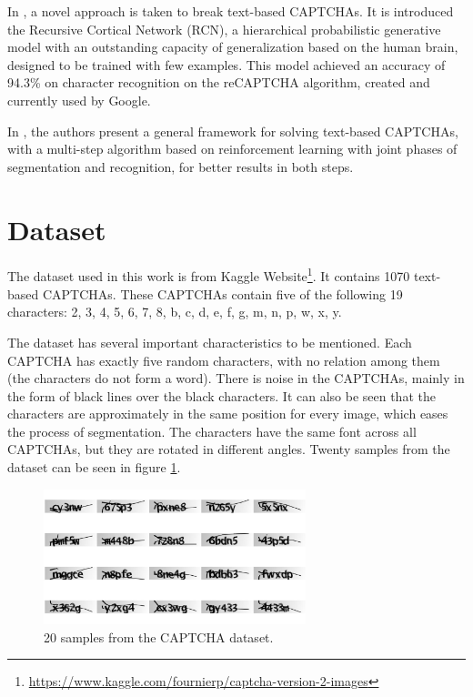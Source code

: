 \documentclass[journal]{IEEEtran}
\begin{document}
In \cite{George2017}, a novel approach is taken to break text-based CAPTCHAs. It is introduced the Recursive Cortical Network (RCN), a hierarchical probabilistic generative model with an outstanding capacity of generalization based on the human brain, designed to be trained with few examples. This model achieved an accuracy of 94.3\% on character recognition on the reCAPTCHA algorithm, created and currently used by Google.

In \cite{185128}, the authors present a general framework for solving text-based CAPTCHAs, with a multi-step algorithm based on reinforcement learning with joint phases of segmentation and recognition, for better results in both steps.


\section{Dataset}

The dataset used in this work is from Kaggle Website\footnote{\url{https://www.kaggle.com/fournierp/captcha-version-2-images}}. It contains 1070 text-based CAPTCHAs. These CAPTCHAs contain five of the following 19 characters: 2, 3, 4, 5, 6, 7, 8, b, c, d, e, f, g, m, n, p, w, x, y.

The dataset has several important characteristics to be mentioned. Each CAPTCHA has exactly five random characters, with no relation among them (the characters do not form a word). There is noise in the CAPTCHAs, mainly in the form of black lines over the black characters. It can also be seen that the characters are approximately in the same position for every image, which eases the process of segmentation. The characters have the same font across all CAPTCHAs, but they are rotated in different angles. Twenty samples from the dataset can be seen in figure \ref{captchas_example}.

\begin{figure}[!t]
\centering
\includegraphics[width=3in]{images/captcha_extraction}
\caption{20 samples from the CAPTCHA dataset.}
\label{captchas_example}
\end{figure}
\end{document}
